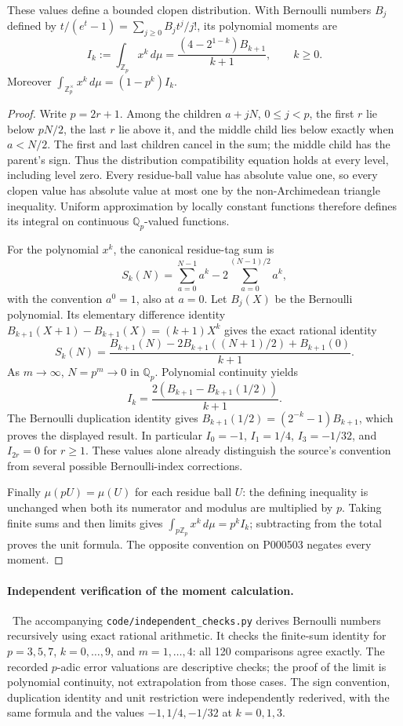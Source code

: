 \begin{proposition}\ours\quad
These values define a bounded clopen distribution. With Bernoulli numbers
\(B_j\) defined by \(t/(e^t-1)=\sum_{j\ge0}B_jt^j/j!\), its polynomial moments are
\[
 I_k:=\int_{\mathbb Z_p}x^k\,d\mu
   =\frac{(4-2^{1-k})B_{k+1}}{k+1},\qquad k\ge0.
\]
Moreover \(\int_{\mathbb Z_p^\times}x^k\,d\mu=(1-p^k)I_k\).
\end{proposition}
\begin{proof}
Write \(p=2r+1\). Among the children \(a+jN\), \(0\le j<p\), the first \(r\)
lie below \(pN/2\), the last \(r\) lie above it, and the middle child lies below
exactly when \(a<N/2\). The first and last children cancel in the sum; the middle
child has the parent's sign. Thus the distribution compatibility equation holds
at every level, including level zero. Every residue-ball value has absolute value one, so every clopen value has absolute value at most one by the non-Archimedean triangle inequality.
Uniform approximation by locally constant functions therefore defines its
integral on continuous \(\mathbb Q_p\)-valued functions.

For the polynomial \(x^k\), the canonical residue-tag sum is
\[
 S_k(N)=\sum_{a=0}^{N-1}a^k-2\sum_{a=0}^{(N-1)/2}a^k,
\]
with the convention \(a^0=1\), also at \(a=0\). Let
\(B_j(X)\) be the Bernoulli polynomial. Its elementary difference identity
\(B_{k+1}(X+1)-B_{k+1}(X)=(k+1)X^k\) gives the exact rational identity
\[
 S_k(N)=\frac{B_{k+1}(N)-2B_{k+1}((N+1)/2)+B_{k+1}(0)}{k+1}.
\]
As \(m\to\infty\), \(N=p^m\to0\) in \(\mathbb Q_p\). Polynomial continuity yields
\[
 I_k=\frac{2(B_{k+1}-B_{k+1}(1/2))}{k+1}.
\]
The Bernoulli duplication identity gives
\(B_{k+1}(1/2)=(2^{-k}-1)B_{k+1}\), which proves the displayed result.
In particular \(I_0=-1\), \(I_1=1/4\), \(I_3=-1/32\), and \(I_{2r}=0\) for
\(r\ge1\). These values alone already distinguish the source's convention from
several possible Bernoulli-index corrections.

Finally \(\mu(pU)=\mu(U)\) for each residue ball \(U\): the defining inequality
is unchanged when both its numerator and modulus are multiplied by \(p\).
Taking finite sums and then limits gives
\(\int_{p\mathbb Z_p}x^k\,d\mu=p^kI_k\); subtracting from the total proves the
unit formula. The opposite convention on P000503 negates every moment.
\end{proof}

\paragraph{Independent verification of the moment calculation.}
\oursComputed\ The accompanying \texttt{code/independent\_checks.py} derives
Bernoulli numbers recursively using exact rational arithmetic. It checks the
finite-sum identity for \(p=3,5,7\), \(k=0,\ldots,9\), and \(m=1,\ldots,4\):
all 120 comparisons agree exactly. The recorded \(p\)-adic error valuations
are descriptive checks; the proof of the limit is polynomial continuity,
not extrapolation from those cases. The sign convention, duplication
identity and unit restriction were independently rederived, with the same
formula and the values \(-1,1/4,-1/32\) at \(k=0,1,3\).


